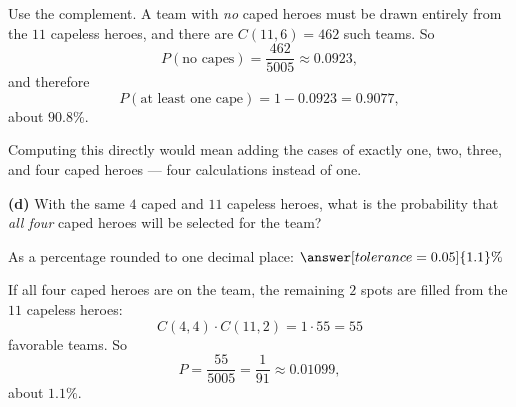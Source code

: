 \documentclass[12pt]{ximera}
\begin{document}
\begin{problem}
\begin{prompt}
\begin{feedback}
Use the complement. A team with \emph{no} caped heroes must be drawn entirely from the
$11$ capeless heroes, and there are $C(11,6)=462$ such teams. So
\[
P(\text{no capes})=\frac{462}{5005}\approx 0.0923,
\]
and therefore
\[
P(\text{at least one cape}) = 1 - 0.0923 = 0.9077,
\]
about $90.8\%$.

Computing this directly would mean adding the cases of exactly one, two, three, and
four caped heroes --- four calculations instead of one.
\end{feedback}
\end{prompt}

\begin{prompt}
\textbf{(d)} With the same $4$ caped and $11$ capeless heroes, what is the probability
that \emph{all four} caped heroes will be selected for the team?

As a percentage rounded to one decimal place: $\answer[tolerance=0.05]{1.1}\%$

\begin{feedback}
If all four caped heroes are on the team, the remaining $2$ spots are filled from the
$11$ capeless heroes:
\[
C(4,4)\cdot C(11,2) = 1\cdot 55 = 55
\]
favorable teams. So
\[
P = \frac{55}{5005} = \frac{1}{91} \approx 0.01099,
\]
about $1.1\%$.
\end{feedback}
\end{prompt}
\end{problem}
\end{document}
